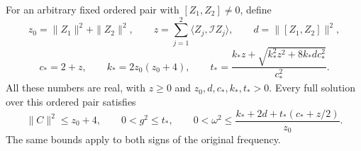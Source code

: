 \begin{proposition}
\label{q444:finite-coupling-bound}
For an arbitrary fixed ordered pair with $[Z_1,Z_2]\ne0$, define
\[
 z_0=\|Z_1\|^2+\|Z_2\|^2,\qquad
 z=\sum_{j=1}^2\langle Z_j,\mathcal IZ_j\rangle,\qquad
 d=\|[Z_1,Z_2]\|^2,
\]
\[
 c_* =2+z,\qquad k_*=2z_0(z_0+4),\qquad
 t_*=
 \frac{k_*z+\sqrt{k_*^2z^2+8k_*d c_*^2}}{c_*^2}.
\]
All these numbers are real, with $z\ge0$ and
$z_0,d,c_*,k_*,t_*>0$.
Every full solution over this ordered pair satisfies
\begin{equation}
 \|C\|^2\le z_0+4,\qquad
 0<g^2\le t_*,\qquad
 0<\omega^2\le
 \frac{k_*+2d+t_*(c_*+z/2)}{z_0}.
 \label{q444:finite-coupling-bounds}
\end{equation}
The same bounds apply to both signs of the original frequency.
\end{proposition}
